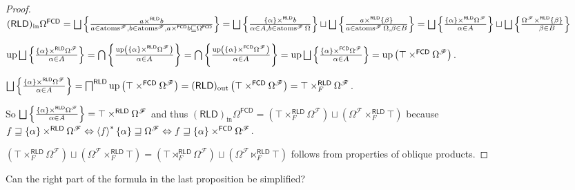 \begin{proof}
  
  $(\mathsf{RLD})_{\operatorname{in}} \Omega^{\mathsf{FCD}} = \bigsqcup
  \setcond{ a \times^{\mathsf{RLD}} b }{ a \in
  \atoms^{\mathscr{F}}, b \in \atoms^{\mathscr{F}}, a
  \times^{\mathsf{FCD}} b \sqsubseteq \Omega^{\mathsf{FCD}}
  } = \bigsqcup \setcond{ \{ \alpha \} \times^{\mathsf{RLD}} b
  }{ \alpha \in A, b \in \atoms^{\mathscr{F}}
  \Omega } \sqcup \bigsqcup \setcond{ a \times^{\mathsf{RLD}} \{
  \beta \} }{ a \in \atoms^{\mathscr{F}}
  \Omega, \beta \in B } = \bigsqcup \setcond{ \{ \alpha \}
  \times^{\mathsf{RLD}} \Omega^{\mathscr{F}} }{
  \alpha \in A } \sqcup \bigsqcup \setcond{
  \Omega^{\mathscr{F}} \times^{\mathsf{RLD}} \{ \beta \} }{
  \hspace{1em} \beta \in B }$
  
  $\up \bigsqcup \setcond{ \{ \alpha \} \times^{\mathsf{RLD}}
  \Omega^{\mathscr{F}} }{ \alpha \in A } =
  \bigcap \setcond{ \up \left( \{ \alpha \} \times^{\mathsf{RLD}}
  \Omega^{\mathscr{F}} \right) }{ \alpha \in A
  } = \bigcap \setcond{ \up \left( \{ \alpha \}
  \times^{\mathsf{FCD}} \Omega^{\mathscr{F}} \right) }{
  \alpha \in A } = \up \bigsqcup \setcond{ \{ \alpha
  \} \times^{\mathsf{FCD}} \Omega^{\mathscr{F}} }{
  \alpha \in A } = \up \left( \top
  \times^{\mathsf{FCD}} \Omega^{\mathscr{F}} \right)$.
  
  $\bigsqcup \setcond{ \{ \alpha \} \times^{\mathsf{RLD}}
  \Omega^{\mathscr{F}} }{ \alpha \in A } =
  \bigsqcap^{\mathsf{RLD}} \up \left( \top
  \times^{\mathsf{FCD}} \Omega^{\mathscr{F}} \right) =
  (\mathsf{RLD})_{\operatorname{out}}  \left( \top \times^{\mathsf{FCD}}
  \Omega^{\mathscr{F}} \right) = \top \times^{\mathsf{RLD}}_F
  \Omega^{\mathscr{F}}$.
  
  So $\bigsqcup \setcond{ \{ \alpha \} \times^{\mathsf{RLD}}
  \Omega^{\mathscr{F}} }{ \alpha \in A } =
  \top \times^{\mathsf{RLD}} \Omega^{\mathscr{F}}$ and thus
  $(\mathsf{RLD})_{\operatorname{in}} \Omega^{\mathsf{FCD}} = \left(
  \top \times^{\mathsf{RLD}}_F \Omega^{\mathscr{F}} \right) \sqcup
  \left( \Omega^{\mathscr{F}} \times^{\mathsf{RLD}}_F \top \right)$
  because
  $f \sqsupseteq \{ \alpha \} \times^{\mathsf{RLD}}
  \Omega^{\mathscr{F}} \Leftrightarrow \left\langle f\right\rangle ^{\ast} \{ \alpha \}
  \sqsupseteq \Omega^{\mathscr{F}} \Leftrightarrow f \sqsupseteq \{ \alpha \}
  \times^{\mathsf{FCD}} \Omega^{\mathscr{F}}$.
  
  $\left(
  \top \times^{\mathsf{RLD}}_F \Omega^{\mathscr{F}} \right) \sqcup
  \left( \Omega^{\mathscr{F}} \times^{\mathsf{RLD}}_F \top \right) =
  \left(
  \top \rtimes^{\mathsf{RLD}}_F \Omega^{\mathscr{F}} \right) \sqcup
  \left( \Omega^{\mathscr{F}} \ltimes^{\mathsf{RLD}}_F \top \right)$
  follows from properties of oblique products.
\end{proof}

\begin{question}
  Can the right part of the formula in the last proposition be simplified?
\end{question}